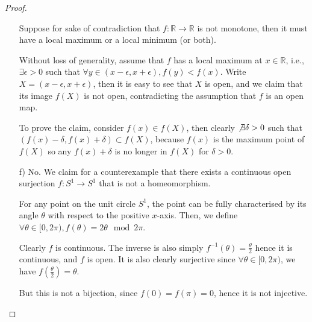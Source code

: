\documentclass[11pt]{article}
\newcommand{\bbR}{\mathbb{R}}
\renewcommand{\_}[1]{\underline{ #1 }}
\theoremstyle{definition}
\numberwithin{equation}{subsection}
\begin{document}
\begin{proof}
\begin{enumerate}
    Suppose for sake of contradiction that $f: \bbR \to \bbR$ is not monotone, then it must have a local maximum or a local minimum (or both). 

    Without loss of generality, assume that $f$ has a local maximum at $x \in \bbR$, i.e., $\exists \epsilon>0$ such that $\forall y \in (x-\epsilon, x+\epsilon), f(y)<f(x)$. Write $X=(x-\epsilon, x+\epsilon)$, then it is easy to see that $X$ is open, and we claim that its image $f(X)$ is not open, contradicting the assumption that $f$ is an open map.

    To prove the claim, consider $f(x) \in f(X)$, then clearly $\not \exists \delta>0$ such that $(f(x)-\delta, f(x)+\delta) \subset f(X)$, because $f(x)$ is the maximum point of $f(X)$ so any $f(x)+\delta$ is no longer in $f(X)$ for $\delta>0$. 
    

    \item[f)] No. We claim for a counterexample that there exists a continuous open surjection $f: S^1 \to S^1$ that is not a homeomorphism.

    For any point on the unit circle $S^1$, the point can be fully characterised by its angle $\theta$ with respect to the positive $x$-axis. Then, we define $\forall \theta \in [0,2\pi), f(\theta)=2\theta \mod 2\pi$. 

    Clearly $f$ is continuous. The inverse is also simply $f^{-1}(\theta)=\frac{\theta}{2}$ hence it is continuous, and $f$ is open. It is also clearly surjective since $\forall \theta \in [0,2\pi)$, we have $f(\frac{\theta}{2})=\theta$.

    But this is not a bijection, since $f(0)=f(\pi)=0$, hence it is not injective.
    

    
    
\end{enumerate}

\end{proof}
\end{document}
